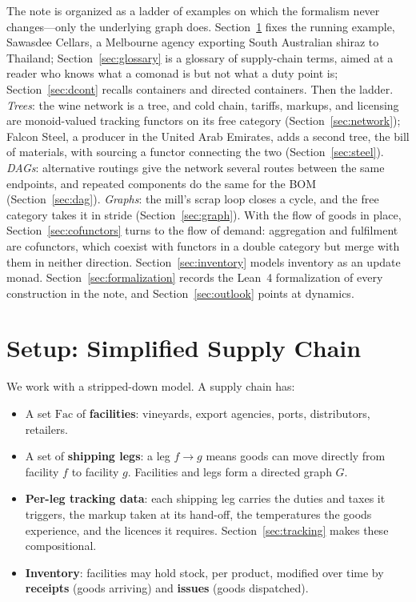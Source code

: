 \documentclass[11pt,a4paper]{article}
\newcommand{\Fac}{\mathrm{Fac}}
\theoremstyle{plain}
\theoremstyle{definition}
\theoremstyle{remark}
\begin{document}
The note is organized as a ladder of examples on which the
formalism never changes---only the underlying graph does.
Section~\ref{sec:setup} fixes the running example, Sawasdee
Cellars, a Melbourne agency exporting South Australian shiraz to
Thailand; Section~\ref{sec:glossary} is a glossary of supply-chain
terms, aimed at a reader who knows what a comonad is but not what a
duty point is; Section~\ref{sec:dcont} recalls containers and
directed containers. Then the ladder. \emph{Trees}: the wine
network is a tree, and cold chain, tariffs, markups, and licensing
are monoid-valued tracking functors on its free category
(Section~\ref{sec:network}); Falcon Steel, a producer in the United
Arab Emirates, adds a second tree, the bill of materials, with
sourcing a functor connecting the two (Section~\ref{sec:steel}).
\emph{DAGs}: alternative routings give the network several routes
between the same endpoints, and repeated components do the same for
the BOM (Section~\ref{sec:dag}). \emph{Graphs}: the mill's scrap
loop closes a cycle, and the free category takes it in stride
(Section~\ref{sec:graph}). With the flow of goods in place,
Section~\ref{sec:cofunctors} turns to the flow of demand:
aggregation and fulfilment are cofunctors, which coexist with
functors in a double category but merge with them in neither
direction. Section~\ref{sec:inventory} models inventory as an
update monad. Section~\ref{sec:formalization} records the Lean~4
formalization of every construction in the note, and
Section~\ref{sec:outlook} points at dynamics.

\section{Setup: Simplified Supply Chain}\label{sec:setup}

We work with a stripped-down model. A supply chain has:

\begin{itemize}[nosep]
\item A set $\Fac$ of \textbf{facilities}: vineyards, export
  agencies, ports, distributors, retailers.
\item A set of \textbf{shipping legs}: a leg $f \to g$ means goods can
  move directly from facility $f$ to facility $g$. Facilities and legs
  form a directed graph $G$.
\item \textbf{Per-leg tracking data}: each shipping leg carries the
  duties and taxes it triggers, the markup taken at its hand-off,
  the temperatures the goods experience, and the licences it
  requires. Section~\ref{sec:tracking} makes these compositional.
\item \textbf{Inventory}: facilities may hold stock, per product,
  modified over time by \textbf{receipts} (goods arriving) and
  \textbf{issues} (goods dispatched).
\end{itemize}
\end{document}
